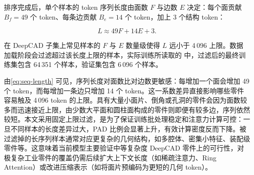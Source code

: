排序完成后，单个样本的 token 序列长度由面数 $F$ 与边数 $E$ 决定：每个面贡献 $B_f = 49$ 个 token、每条边贡献 $B_e = 14$ 个 token，加上 3 个结构 token：

\begin{equation}
    L \approx 49 F + 14 E + 3.
    \label{eq:seq-length}
\end{equation}

在 DeepCAD 子集上常见样本的 $F$ 与 $E$ 数量级使得 $L$ 远小于 4\,096 上限。数据加载阶段会过滤超过该长度上限的样本，实际训练所读取的  中，过滤后的最终训练集包含 64\,351 个样本，验证集包含 6\,096 个样本。

由\autoref{eq:seq-length} 可见，序列长度对面数比对边数更敏感：每增加一个面会增加 49 个 token，而每增加一条边只增加 14 个 token。这一系数差异直接影响哪些零件容易触及 4\,096 token 的上限。具有大量小面片、倒角或孔洞的零件会因为面数较多而迅速接近上限，由少数大平面和圆柱面构成的零件则即便有较多边，序列依然较短。本文采用固定上限过滤，是为了保证训练批处理稳定和注意力计算可控：一旦不同样本的长度差异过大，PAD 比例会显著上升，有效计算密度反而下降。被过滤掉的长序列样本通常对应更复杂的几何结构，如多腔体、密集小特征、装配级零件等。这意味着当前模型主要验证中等复杂度 DeepCAD 零件上的可行性，对极复杂工业零件的覆盖仍需后续扩大上下文长度（如稀疏注意力、Ring Attention）或改进压缩表示（如将面片预编码为更短的几何 token）。
